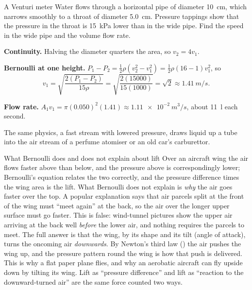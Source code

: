\begin{exbox}{A Venturi meter}\label{ex:fluids-venturi}
Water flows through a horizontal pipe of diameter \SI{10}{cm}, which narrows smoothly to a throat of
diameter \SI{5.0}{cm}. Pressure tappings show that the pressure in the throat is \SI{15}{kPa} lower than in
the wide pipe. Find the speed in the wide pipe and the volume flow rate.

 \textbf{Continuity.} Halving the diameter quarters the area, so $v_2=4v_1$.

 \textbf{Bernoulli at one height.} $P_1-P_2=\tfrac12\rho(v_2^2-v_1^2)=\tfrac12\rho(16-1)v_1^2$, so
\[
v_1=\sqrt{\frac{2(P_1-P_2)}{15\rho}}=\sqrt{\frac{2(15000)}{15(1000)}}=\sqrt2\approx\SI{1.41}{m/s}.
\]

 \textbf{Flow rate.} $A_1v_1=\pi(0.050)^2(1.41)\approx\SI{1.11e-2}{m^3/s}$, about \SI{11}{\litre}
each second.

\medskip
The same physics, a fast stream with lowered pressure, draws liquid up a tube into the air stream of a
perfume atomiser or an old car's carburettor. 
\end{exbox}


\begin{remarkbox}{What Bernoulli does and does not explain about lift}
Over an aircraft wing the air flows faster above than below, and the pressure above is correspondingly
lower; Bernoulli's equation relates the two correctly, and the pressure difference times the wing area is
the lift. What Bernoulli does not explain is \emph{why} the air goes faster over the top. A popular
explanation says that air parcels split at the front of the wing must ``meet again'' at the back, so the
air over the longer upper surface must go faster. This is false: wind-tunnel pictures show the upper air
arriving at the back well \emph{before} the lower air, and nothing requires the parcels to meet. The full
answer is that the wing, by its shape and its tilt (angle of attack), turns the oncoming air
\emph{downwards}. By Newton's third law () the air pushes the wing up, and the pressure
pattern round the wing is how that push is delivered. This is why a flat paper plane flies, and why an
aerobatic aircraft can fly upside down by tilting its wing. Lift as ``pressure difference'' and lift as
``reaction to the downward-turned air'' are the same force counted two ways.
\end{remarkbox}

